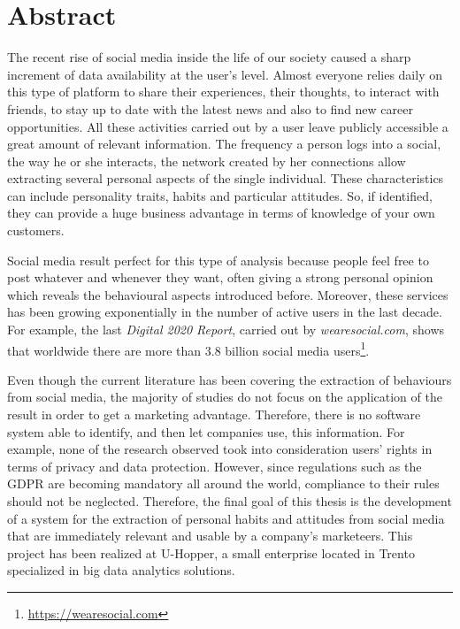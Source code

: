 \chapter*{Abstract}
The recent rise of social media inside the life of our society caused a sharp increment of data availability at the user's level.
Almost everyone relies daily on this type of platform to share their experiences, their thoughts, to interact with friends, to stay up to date with the latest news and also to find new career opportunities.
All these activities carried out by a user leave publicly accessible a great amount of relevant information. The frequency a person logs into a social, the way he or she interacts, the network created by her connections
allow extracting several personal aspects of the single individual. These characteristics can include personality traits, habits and particular attitudes. So, if identified, they can provide a huge business advantage in terms of knowledge of your own customers.

Social media result perfect for this type of analysis because people feel free to post whatever and whenever they want, often giving a strong personal opinion which reveals the behavioural aspects introduced before.
Moreover, these services has been growing exponentially in the number of active users in the last decade. For example, the last \emph{Digital 2020 Report}, carried out by \textit{wearesocial.com}, shows that worldwide there are more than 3.8 billion social media users\footnote{\url{https://wearesocial.com}}.

Even though the current literature has been covering the extraction of behaviours from social media, the majority of studies do not focus on the application of the result in order to get a marketing advantage.
Therefore, there is no software system able to identify, and then let companies use, this information.
For example, none of the research observed took into consideration users' rights in terms of privacy and data protection. 
However, since regulations such as the GDPR are becoming mandatory all around the world, compliance to their rules should not be neglected.
Therefore, the final goal of this thesis is the development of a system for the extraction of personal habits and attitudes from social media that are immediately relevant and usable by a company's marketeers.
This project has been realized at U-Hopper, a small enterprise located in Trento specialized in big data analytics solutions.


